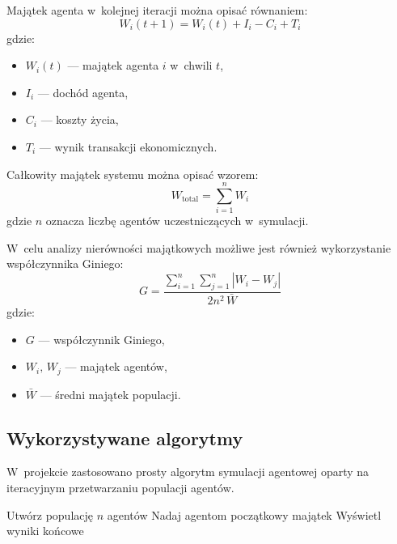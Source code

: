 \documentclass[polish]{projectreport}
\begin{document}
Maj\k{a}tek agenta w~kolejnej iteracji mo\.{z}na opisa\'{c} r\'ownaniem:
\begin{equation}
  W_i(t+1) = W_i(t) + I_i - C_i + T_i
\end{equation}
gdzie:
\begin{itemize}
  \item $W_i(t)$ --- maj\k{a}tek agenta $i$ w~chwili $t$,
  \item $I_i$ --- doch\'od agenta,
  \item $C_i$ --- koszty \.{z}ycia,
  \item $T_i$ --- wynik transakcji ekonomicznych.
\end{itemize}

Ca\l{}kowity maj\k{a}tek systemu mo\.{z}na opisa\'{c} wzorem:
\begin{equation}
  W_{\mathrm{total}} = \sum_{i=1}^{n} W_i
\end{equation}
gdzie $n$ oznacza liczb\k{e} agent\'ow uczestnicz\k{a}cych w~symulacji.

W~celu analizy nier\'owno\'sci maj\k{a}tkowych mo\.{z}liwe jest r\'ownie\.{z} wykorzystanie
wsp\'o\l{}czynnika Giniego:
\begin{equation}
  G = \frac{\displaystyle\sum_{i=1}^{n}\sum_{j=1}^{n} |W_i - W_j|}{2n^2\,\bar{W}}
\end{equation}
gdzie:
\begin{itemize}
  \item $G$ --- wsp\'o\l{}czynnik Giniego,
  \item $W_i,\, W_j$ --- maj\k{a}tek agent\'ow,
  \item $\bar{W}$ --- \'sredni maj\k{a}tek populacji.
\end{itemize}

\subsection{Wykorzystywane algorytmy}
\label{sec:algorithms}

W~projekcie zastosowano prosty algorytm symulacji agentowej oparty na iteracyjnym
przetwarzaniu populacji agentów. \\[1\baselineskip]

\begin{algorithm}[H]
\caption{Algorytm symulacji systemu spo\l{}eczno-ekonomicznego}
\label{alg:simulation}
Utw\'orz populacj\k{e} $n$ agent\'ow\;
Nadaj agentom pocz\k{a}tkowy maj\k{a}tek\;
Wy\'swietl wyniki ko\'ncowe\;
\end{algorithm}
\end{document}
